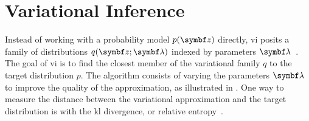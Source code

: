 \section{Variational Inference}

Instead of working with a probability model $p(\mbz)$ directly, \acrfull{vi} posits a family of distributions $q(\mbz; \mblambda)$ indexed by parameters $\mblambda$~\citep{blei2017variational}. The goal of \gls{vi} is to find the closest member of the variational family $q$ to the target distribution $p$. The algorithm consists of varying the parameters $\mblambda$ to improve the quality of the approximation, as illustrated in . One way to measure the distance between the variational approximation and the target distribution is with the \acrfull{kl} divergence, or relative entropy~\citep{mackay2003information,ranganath2018black}.

